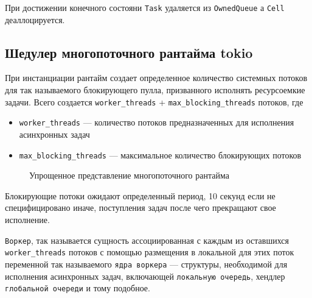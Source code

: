 При достижении конечного состояни \verb|Task| удаляется из \verb|OwnedQueue| а \verb|Cell| деаллоцируется.

\subsection{Шедулер многопоточного рантайма tokio}

При инстанциации рантайм создает определенное количество системных потоков для так называемого блокирующего пулла, призванного исполнять ресурсоемкие задачи. Всего создается \verb|worker_threads| + \verb|max_blocking_threads| потоков, где

\begin{itemize}
    \item \verb|worker_threads| --- количество потоков предназначенных для исполнения асинхронных задач
    \item \verb|max_blocking_threads| --- максимальное количество блокирующих потоков
\end{itemize}

\begin{figure}[H]
    \begin{center}
    \end{center}

    \caption{Упрощенное представление многопоточного рантайма}
    \label{fig:tokio:arch}
\end{figure}

Блокирующие потоки ожидают определенный период, 10 секунд если не специфицировано иначе, поступления задач после чего прекращают свое исполнение.

\verb|Воркер|, так называется сущность ассоциированная с каждым из оставшихся \verb|worker_threads| потоков с помощью размещения в локальной для этих поток переменной так называемого \verb|ядра воркера| --- структуры, необходимой для исполнения асинхронных задач, включающей \verb|локальную очередь|, хендлер \verb|глобальной очереди| и тому подобное.

